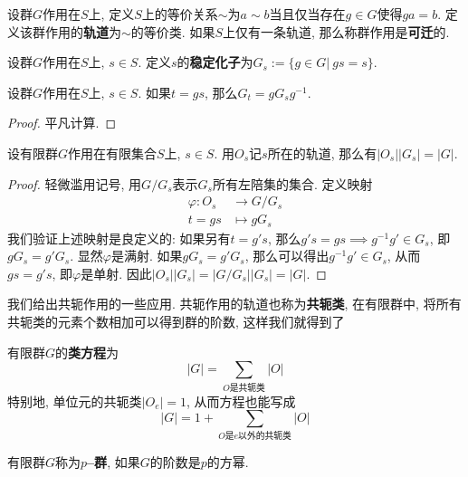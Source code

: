 \begin{defn}
    设群$G$作用在$S$上, 定义$S$上的等价关系$\sim$为$a\sim b$当且仅当存在$g\in G$使得$ga=b$.
    定义该群作用的\textbf{轨道}为$\sim$的等价类.
    如果$S$上仅有一条轨道, 那么称群作用是\textbf{可迁}的.
\end{defn}

\begin{defn}
    设群$G$作用在$S$上, $s\in S$.
    定义$s$的\textbf{稳定化子}为$G_s:=\{g\in G|\ gs=s\}$.
\end{defn}

\begin{lem}
    设群$G$作用在$S$上, $s\in S$.
    如果$t=gs$, 那么$G_t=gG_sg^{-1}$.
\end{lem}
\begin{proof}
    平凡计算.
\end{proof}

\begin{prop}[计数公式]
    设有限群$G$作用在有限集合$S$上, $s\in S$.
    用$O_s$记$s$所在的轨道, 那么有$|O_s||G_s|=|G|$.
\end{prop}
\begin{proof}
    轻微滥用记号, 用$G/G_s$表示$G_s$所有左陪集的集合.
    定义映射
    \begin{align*}
        \varphi:O_s&\to G/G_s\\
        t=gs&\mapsto gG_s
    \end{align*}
    我们验证上述映射是良定义的: 如果另有$t=g's$, 那么$g's=gs\implies g^{-1}g'\in G_s$, 即$gG_s=g'G_s$.
    显然$\varphi$是满射.
    如果$gG_s=g'G_s$, 那么可以得出$g^{-1}g'\in G_s$, 从而$gs=g's$, 即$\varphi$是单射.
    因此$|O_s||G_s|=|G/G_s||G_s|=|G|$.
\end{proof}

我们给出共轭作用的一些应用.
共轭作用的轨道也称为\textbf{共轭类}, 在有限群中, 将所有共轭类的元素个数相加可以得到群的阶数, 这样我们就得到了
\begin{prop}
    有限群$G$的{\bf 类方程}为
    \[|G|=\sum_{O\text{是共轭类}}|O|\]
    特别地, 单位元的共轭类$|O_e|=1$, 从而方程也能写成
    \[|G|=1+\sum_{O\text{是}e\text{以外的共轭类}}|O|\]
\end{prop}

\begin{defn}
    有限群$G$称为{\bf $p$--群}, 如果$G$的阶数是$p$的方幂.
\end{defn}

